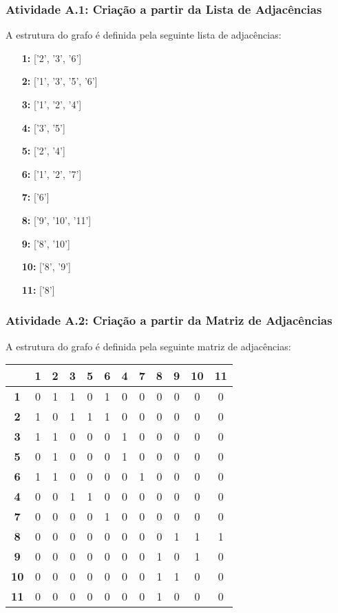 \documentclass[a4paper,12pt]{article}
\begin{document}
\subsubsection*{Atividade A.1: Criação a partir da Lista de Adjacências}
A estrutura do grafo é definida pela seguinte lista de adjacências:
\begin{itemize}[leftmargin=*]
    \item[\textbf{1:}] ['2', '3', '6']
    \item[\textbf{2:}] ['1', '3', '5', '6']
    \item[\textbf{3:}] ['1', '2', '4']
    \item[\textbf{4:}] ['3', '5']
    \item[\textbf{5:}] ['2', '4']
    \item[\textbf{6:}] ['1', '2', '7']
    \item[\textbf{7:}] ['6']
    \item[\textbf{8:}] ['9', '10', '11']
    \item[\textbf{9:}] ['8', '10']
    \item[\textbf{10:}] ['8', '9']
    \item[\textbf{11:}] ['8']
\end{itemize}

\subsubsection*{Atividade A.2: Criação a partir da Matriz de Adjacências}
A estrutura do grafo é definida pela seguinte matriz de adjacências:
\begin{center}
\scriptsize
\begin{tabular*}{\textwidth}{c|@{\extracolsep{\fill}}ccccccccccc}
\rowcolor[gray]{0.9}
 & \textbf{1} & \textbf{2} & \textbf{3} & \textbf{5} & \textbf{6} & \textbf{4} & \textbf{7} & \textbf{8} & \textbf{9} & \textbf{10} & \textbf{11} \\
\hline
\textbf{1} & 0 & 1 & 1 & 0 & 1 & 0 & 0 & 0 & 0 & 0 & 0 \\
\textbf{2} & 1 & 0 & 1 & 1 & 1 & 0 & 0 & 0 & 0 & 0 & 0 \\
\textbf{3} & 1 & 1 & 0 & 0 & 0 & 1 & 0 & 0 & 0 & 0 & 0 \\
\textbf{5} & 0 & 1 & 0 & 0 & 0 & 1 & 0 & 0 & 0 & 0 & 0 \\
\textbf{6} & 1 & 1 & 0 & 0 & 0 & 0 & 1 & 0 & 0 & 0 & 0 \\
\textbf{4} & 0 & 0 & 1 & 1 & 0 & 0 & 0 & 0 & 0 & 0 & 0 \\
\textbf{7} & 0 & 0 & 0 & 0 & 1 & 0 & 0 & 0 & 0 & 0 & 0 \\
\textbf{8} & 0 & 0 & 0 & 0 & 0 & 0 & 0 & 0 & 1 & 1 & 1 \\
\textbf{9} & 0 & 0 & 0 & 0 & 0 & 0 & 0 & 1 & 0 & 1 & 0 \\
\textbf{10} & 0 & 0 & 0 & 0 & 0 & 0 & 0 & 1 & 1 & 0 & 0 \\
\textbf{11} & 0 & 0 & 0 & 0 & 0 & 0 & 0 & 1 & 0 & 0 & 0 \\
\end{tabular*}
\end{center}
\end{document}
